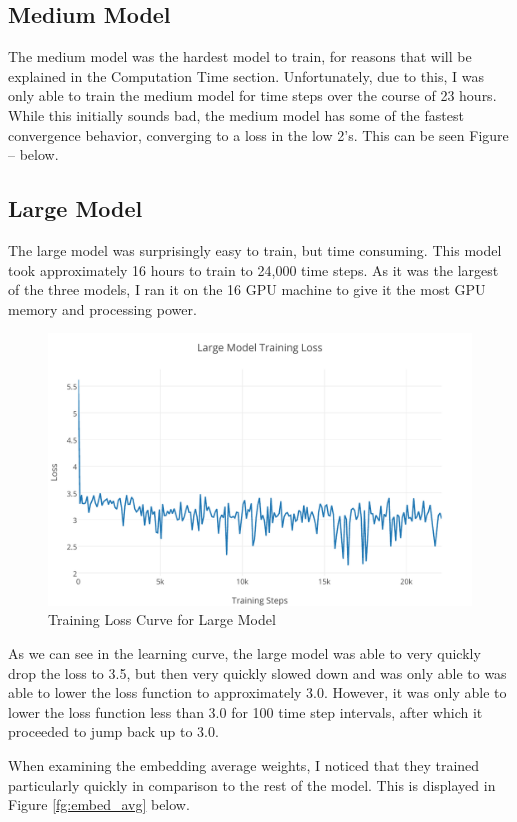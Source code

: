 \documentclass[pageno]{jpaper}
\begin{document}
\subsection{Medium Model}
The medium model was the hardest model to train, for reasons that will be explained in the Computation Time section.  Unfortunately, due to this, I was only able to train the medium model for  time steps over the course of 23 hours.  While this initially sounds bad, the medium model has some of the fastest convergence behavior, converging to a loss in the low 2's.  This can be seen Figure -- below.

\subsection{Large Model}
The large model was surprisingly easy to train, but time consuming.  This model took approximately 16 hours to train to 24,000 time steps.  As it was the largest of the three models, I ran it on the 16 GPU machine to give it the most GPU memory and processing power.  
\begin{figure}[H]
	\centering
	\includegraphics[scale=0.85]{Large_Loss.pdf}
	\caption{Training Loss Curve for Large Model}
	\label{fg:large_loss}
\end{figure}

As we can see in the learning curve, the large model was able to very quickly drop the loss to 3.5, but then very quickly slowed down and was only able to was able to lower the loss function to approximately 3.0.  However, it was only able to lower the loss function less than 3.0 for 100 time step intervals, after which it proceeded to jump back up to 3.0.

\par
When examining the embedding average weights, I noticed that they trained particularly quickly in comparison to the rest of the model.  This is displayed in Figure \ref{fg:embed_avg} below.
\end{document}
